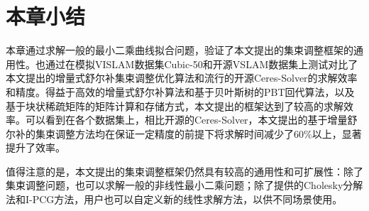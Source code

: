 \section{本章小结}

本章通过求解一般的最小二乘曲线拟合问题，验证了本文提出的集束调整框架的通用性。也通过在模拟VISLAM数据集Cubic-50和开源VSLAM数据集上测试对比了本文提出的增量式舒尔补集束调整优化算法和流行的开源Ceres-Solver的求解效率和精度。得益于高效的增量式舒尔补算法和基于贝叶斯树的PBT回代算法，以及基于块状稀疏矩阵的矩阵计算和存储方式，本文提出的框架达到了较高的求解效率。可以看到在各个数据集上，相比开源的Ceres-Solver，本文提出的基于增量舒尔补的集束调整方法均在保证一定精度的前提下将求解时间减少了$60\%$以上，显著提升了效率。

值得注意的是，本文提出的集束调整框架仍然具有较高的通用性和可扩展性：除了集束调整问题，也可以求解一般的非线性最小二乘问题；除了提供的Cholesky分解法和I-PCG方法，用户也可以自定义新的线性求解方法，以供不同场景使用。
